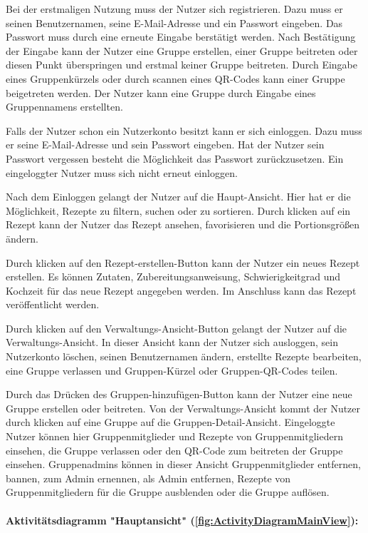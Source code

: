 \documentclass[parskip=full]{scrartcl}
\begin{document}
Bei der erstmaligen Nutzung muss der Nutzer sich registrieren.
Dazu muss er seinen Benutzernamen, seine E-Mail-Adresse und ein Passwort eingeben.
Das Passwort muss durch eine erneute Eingabe berstätigt werden.
Nach Bestätigung der Eingabe kann der Nutzer eine Gruppe erstellen, einer Gruppe beitreten oder diesen Punkt überspringen und erstmal keiner Gruppe beitreten.
Durch Eingabe eines Gruppenkürzels oder durch scannen eines QR-Codes kann einer Gruppe beigetreten werden.
Der Nutzer kann eine Gruppe durch Eingabe eines Gruppennamens erstellten.\par
Falls der Nutzer schon ein Nutzerkonto besitzt kann er sich einloggen.
Dazu muss er seine E-Mail-Adresse und sein Passwort eingeben.
Hat der Nutzer sein Passwort vergessen besteht die Möglichkeit das Passwort zurückzusetzen.
Ein eingeloggter Nutzer muss sich nicht erneut einloggen.\par
Nach dem Einloggen gelangt der Nutzer auf die Haupt-Ansicht.
Hier hat er die Möglichkeit, Rezepte zu filtern, suchen oder zu sortieren.
Durch klicken auf ein Rezept kann der Nutzer das Rezept ansehen, favorisieren und die Portionsgrößen ändern.\par
Durch klicken auf den Rezept-erstellen-Button kann der Nutzer ein neues Rezept erstellen.
Es können Zutaten, Zubereitungsanweisung, Schwierigkeitgrad und Kochzeit ƒür das neue Rezept angegeben werden.
Im Anschluss kann das Rezept veröffentlicht werden.\par
Durch klicken auf den Verwaltungs-Ansicht-Button
gelangt der Nutzer auf die Verwaltungs-Ansicht.
In dieser Ansicht kann der Nutzer sich ausloggen, sein Nutzerkonto löschen, seinen Benutzernamen ändern,
erstellte Rezepte bearbeiten, eine Gruppe verlassen und Gruppen-Kürzel oder Gruppen-QR-Codes teilen.\par
Durch das Drücken des Gruppen-hinzufügen-Button kann der Nutzer eine neue Gruppe erstellen oder beitreten.
Von der Verwaltungs-Ansicht kommt der Nutzer durch klicken auf eine Gruppe auf die Gruppen-Detail-Ansicht.
Eingeloggte Nutzer können hier Gruppenmitglieder und Rezepte von Gruppenmitgliedern einsehen, die Gruppe verlassen oder den QR-Code zum beitreten der Gruppe einsehen.
Gruppenadmins können in dieser Ansicht Gruppenmitglieder entfernen, bannen, zum Admin ernennen, als Admin entfernen, Rezepte von Gruppenmitgliedern für die Gruppe ausblenden oder die Gruppe auflösen.\par


\paragraph{Aktivitätsdiagramm "Hauptansicht" (\autoref{fig:ActivityDiagramMainView}):}
\end{document}
